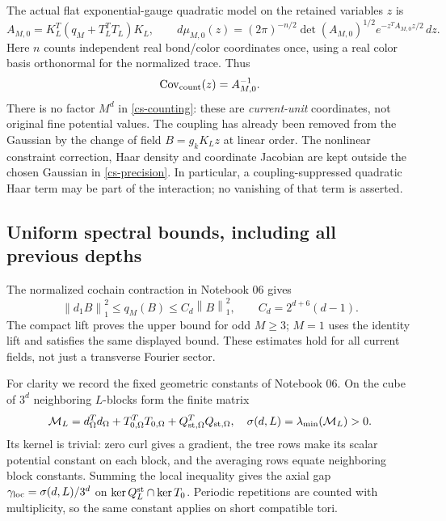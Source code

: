 \documentclass[11pt]{article}
\theoremstyle{remark}
\newcommand{\norm}[1]{\left\|#1\right\|}
\begin{document}
The actual flat exponential-gauge quadratic model on the retained
variables $z$ is
\begin{equation}\label{cs-precision}
 A_{M,0}=K_L^T(q_M+T_L^TT_L)K_L,\qquad
 d\mu_{M,0}(z)=
 (2\pi)^{-n/2}\det(A_{M,0})^{1/2}
 e^{-z^TA_{M,0}z/2}\,dz .
\end{equation}
Here $n$ counts independent real bond/color coordinates once, using
a real color basis orthonormal for the normalized trace. Thus
\begin{equation}\label{cs-counting}
 \operatorname{Cov}_{\rm count}(z)=A_{M,0}^{-1}.
\end{equation}
There is no factor $M^d$ in \eqref{cs-counting}: these are
\emph{current-unit} coordinates, not original fine potential values.
The coupling has already been removed from the Gaussian by the
change of field $B=g_kK_Lz$ at linear order. The nonlinear constraint
correction, Haar density and coordinate Jacobian are kept outside
the chosen Gaussian in \eqref{cs-precision}. In particular, a
coupling-suppressed quadratic Haar term may be part of the
interaction; no vanishing of that term is asserted.

\subsection{Uniform spectral bounds, including all previous depths}

The normalized cochain contraction in Notebook 06 gives
\begin{equation}\label{cs-energy-sandwich}
 \norm{d_1B}_1^2\le q_M(B)\le C_d\norm B_1^2,
 \qquad C_d=2^{d+6}(d-1).
\end{equation}
The compact lift proves the upper bound for odd $M\ge3$; $M=1$
uses the identity lift and satisfies the same displayed bound.
These estimates hold for all current fields, not just a transverse
Fourier sector.

For clarity we record the fixed geometric constants of Notebook 06.
On the cube of $3^d$ neighboring $L$-blocks form the finite matrix
\[
 \mathcal M_L=d_\Omega^Td_\Omega+
 T_{0,\Omega}^TT_{0,\Omega}+
 Q_{{\rm st},\Omega}^TQ_{{\rm st},\Omega},
 \quad \sigma(d,L)=\lambda_{\min}(\mathcal M_L)>0.
\]
Its kernel is trivial: zero curl gives a gradient, the tree rows
make its scalar potential constant on each block, and the averaging
rows equate neighboring block constants. Summing the local
inequality gives the axial gap
$\gamma_{\rm loc}=\sigma(d,L)/3^d$ on
$\ker Q_L^{\rm st}\cap\ker T_0$. Periodic repetitions are counted
with multiplicity, so the same constant applies on short compatible
tori.
\end{document}
